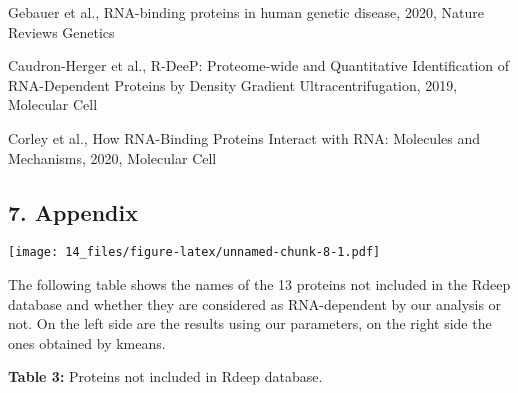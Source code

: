 \documentclass[
  12pt,
]{article}
\begin{document}
Gebauer et al., RNA-binding proteins in human genetic disease, 2020,
Nature Reviews Genetics

Caudron-Herger et al., R-DeeP: Proteome-wide and Quantitative
Identification of RNA-Dependent Proteins by Density Gradient
Ultracentrifugation, 2019, Molecular Cell

Corley et al., How RNA-Binding Proteins Interact with RNA: Molecules and
Mechanisms, 2020, Molecular Cell

\hypertarget{appendix}{%
\subsection{7. Appendix}\label{appendix}}

\texttt{[image: 14\_files/figure-latex/unnamed-chunk-8-1.pdf]}

The following table shows the names of the 13 proteins not included in
the Rdeep database and whether they are considered as RNA-dependent by
our analysis or not. On the left side are the results using our
parameters, on the right side the ones obtained by kmeans.

\textbf{Table 3:} Proteins not included in Rdeep database.
\end{document}
